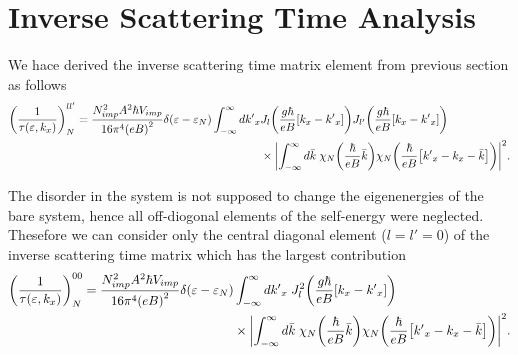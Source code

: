 \section{Inverse Scattering Time Analysis}

We hace derived the inverse scattering time matrix element from previous section as follows
\begin{equation} \label{5.1}
  \begin{aligned}
    \qty(\frac{1}{\tau(\varepsilon,k_x)})^{ll'}_{N} =
    \frac { N_{imp}^2 A^2 \hbar V_{imp}}{16\pi^4 \qty(eB)^2}
    \delta(\varepsilon - \varepsilon_{N})
    \int_{-\infty}^{\infty} d {k'}_x
    &
    J_l\qty(\frac{g\hbar}{eB}[{k}_x - {k'}_x])
    J_{l'}\qty(\frac{g\hbar}{eB}[{k}_x - {k'}_x]) \\
    & \times
    \qty|
    \int_{-\infty}^{\infty} d\bar{k} \;
    {\chi}_{N}\qty(\frac{\hbar}{eB}\bar{k})
    {\chi}_{N}\qty(\frac{\hbar}{eB} \qty[{k'}_x - {k}_x - \bar{k}])|^2.
  \end{aligned}
\end{equation}

\noindent
The disorder in the system is not supposed to change the eigenenergies of the bare system, hence all off-diogonal elements of the self-energy were neglected. Thesefore we can consider only the central diagonal element (${l=l'=0}$) of the inverse scattering time matrix which has the largest contribution
\begin{equation} \label{5.2}
  \begin{aligned}
    \qty(\frac{1}{\tau(\varepsilon,k_x)})^{00}_{N} =
    \frac { N_{imp}^2 A^2 \hbar V_{imp}}{16\pi^4 \qty(eB)^2}
    \delta(\varepsilon - \varepsilon_{N}) &
    \int_{-\infty}^{\infty} d {k'}_x \;
    J_l^2\qty(\frac{g\hbar}{eB}[{k}_x - {k'}_x])
    \\
    & \times
    \qty|
    \int_{-\infty}^{\infty} d\bar{k} \;
    {\chi}_{N}\qty(\frac{\hbar}{eB}\bar{k})
    {\chi}_{N}\qty(\frac{\hbar}{eB} \qty[{k'}_x - {k}_x - \bar{k}])|^2.
  \end{aligned}
\end{equation}

